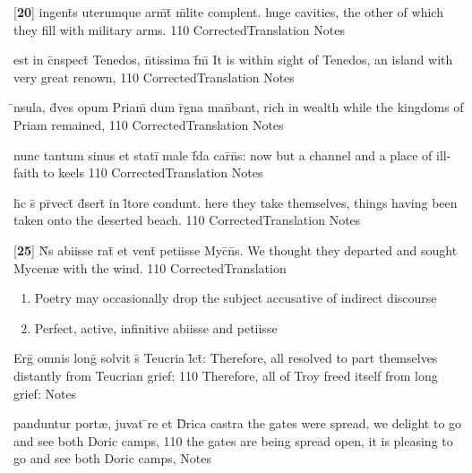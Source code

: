 \latline
  {[\textbf{20}] ingent\={\macron {\i}}s uterumque arm\={}t\={} m\={\macron {\i}}lite complent.}
  { huge cavities, the other of which they fill with military arms. }
  {110}
  { CorrectedTranslation }
  { Notes }


\latline
  {est in c\={}nspect\={} Tenedos, n\={}tissima f\={}m\={}}
  { It is within sight of Tenedos, an island with very great renown, }
  {110}
  { CorrectedTranslation }
  { Notes }


\latline
  {\={\macron {\i}}nsula, d\={\macron {\i}}ves opum Priam\={\macron {\i}} dum r\={}gna man\={}bant,}
  { rich in wealth while the kingdoms of Priam remained,  }
  {110}
  { CorrectedTranslation }
  { Notes }


\latline
  {nunc tantum sinus et stati\={} male f\={\macron {\i}}da car\={\macron {\i}}n\={\macron {\i}}s:}
  { now but a channel and a place of ill-faith to keels }
  {110}
  { CorrectedTranslation }
  { Notes }


\latline
  {h\={}c s\={} pr\={}vect\={\macron {\i}} d\={}sert\={} in l\={\macron {\i}}tore condunt.}
  { here they take themselves, things having been taken onto the deserted beach. }
  {110}
  { CorrectedTranslation }
  { Notes }


\latline
  {[\textbf{25}] N\={}s abiisse rat\={\macron {\i}} et vent\={} petiisse Myc\={}n\={}s.}
  { We thought they departed and sought Mycen{\ae} with the wind. }
  {110}
  { CorrectedTranslation }
  { \begin{enumerate}
  	\item Poetry may occasionally drop the subject accusative of indirect discourse
  	\item Perfect, active, infinitive abiisse and petiisse
  \end{enumerate} }


\latline
  {Erg\={} omnis long\={} solvit s\={} Teucria l\={}ct\={}:}
  { Therefore, all resolved to part themselves distantly from Teucrian grief: }
  {110}
  { Therefore, all of Troy freed itself from long grief: }
  { Notes }


\latline
  {panduntur port{\ae}, juvat \={\macron {\i}}re et D\={}rica castra}
  { the gates were spread, we delight to go and see both Doric camps, }
  {110}
  { the gates are being spread open, it is pleasing to go and see both Doric camps, }
  { Notes }


